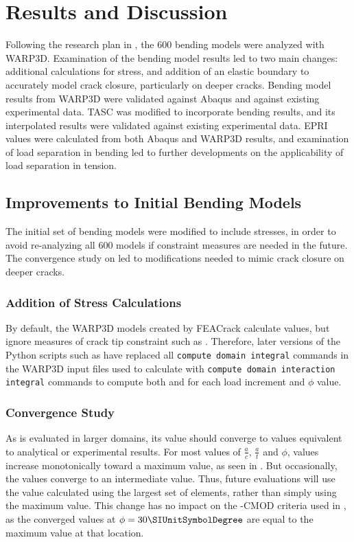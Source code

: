 \chapter{Results and Discussion}
\label{chap:results}

Following the research plan in , the 600 bending models were analyzed with WARP3D.
Examination of the bending model results led to two main changes: additional calculations for \T stress, and addition of an elastic boundary to accurately model crack closure, particularly on deeper cracks.
Bending model results from WARP3D were validated against Abaqus and against existing experimental data.
TASC was modified to incorporate bending results, and its interpolated results were validated against existing experimental data.
EPRI \hone values were calculated from both Abaqus and WARP3D results, and examination of load separation in bending led to further developments on the applicability of load separation in tension.

\section{Improvements to Initial Bending Models}

The initial set of bending models were modified to include \T stresses, in order to avoid re-analyzing all 600 models if constraint measures are needed in the future.
The convergence study on \J led to modifications needed to mimic crack closure on deeper cracks.

\subsection{Addition of \T Stress Calculations}

By default, the WARP3D models created by FEACrack calculate \J values, but ignore measures of crack tip constraint such as \T.
Therefore, later versions of the Python scripts such as  have replaced all \verb|compute domain integral| commands in the WARP3D input files used to calculate \J with \verb|compute domain interaction integral| commands to compute both \J and \T for each load increment and \(\phi\) value.

\subsection{\J Convergence Study}

As \J is evaluated in larger domains, its value should converge to values equivalent to analytical or experimental results.
For most values of \(\frac{a}{c}\), \(\frac{a}{t}\) and \(\phi\), \J values increase monotonically toward a maximum \J value, as seen in .
But occasionally, the \J values converge to an intermediate value.
Thus, future \J evaluations will use the value calculated using the largest set of elements, rather than simply using the maximum value.
This change has no impact on the \J-CMOD criteria used in , as the converged \J values at \(\phi=30{\SIUnitSymbolDegree}\) are equal to the maximum \J value at that location.

